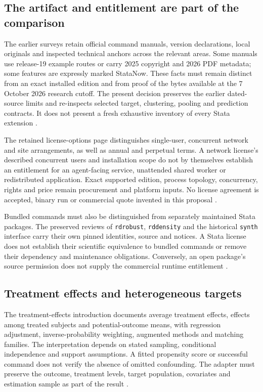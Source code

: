 \subsection{The artifact and entitlement are part of the comparison}
The earlier surveys retain official command manuals, version declarations,
local originals and inspected technical anchors across the relevant areas.
Some manuals use release-19 example routes or carry 2025 copyright and
2026 PDF metadata; some features are expressly marked StataNow. These
facts must remain distinct from an exact installed edition and from proof
of the bytes available at the 7 October 2026 research cutoff. The present
decision preserves the earlier dated-source limits and re-inspects selected
target, clustering, pooling and prediction contracts. It does not present
a fresh exhaustive inventory of every Stata extension
\citep{exec20_med_stata_multiple,exec18_gp_stata_post,exec24_stata_choice}.

The retained license-options page distinguishes single-user, concurrent
network and site arrangements, as well as annual and perpetual terms.
A network license's described concurrent users and installation scope do
not by themselves establish an entitlement for an agent-facing service,
unattended shared worker or redistributed application. Exact supported
edition, process topology, concurrency, rights and price remain procurement
and platform inputs. No license agreement is accepted, binary run or
commercial quote invented in this proposal \citep{exec13_ivrd_license,
exec24_stata_choice}.

Bundled commands must also be distinguished from separately maintained
Stata packages. The preserved reviews of \texttt{rdrobust},
\texttt{rddensity} and the historical \texttt{synth} interface carry their
own pinned identities, source and notices. A Stata license does not
establish their scientific equivalence to bundled commands or remove their
dependency and maintenance obligations. Conversely, an open package's
source permission does not supply the commercial runtime entitlement
\citep{exec13_ivrd_rdrobust,exec13_ivrd_rddensity,exec19_synth_stata_source,
exec24_stata_choice}.

\subsection{Treatment effects and heterogeneous targets}
The treatment-effects introduction documents average treatment effects,
effects among treated subjects and potential-outcome means, with regression
adjustment, inverse-probability weighting, augmented methods and matching
families. The interpretation depends on stated sampling, conditional
independence and support assumptions. A fitted propensity score or
successful command does not verify the absence of omitted confounding.
The adapter must preserve the outcome, treatment levels, target population,
covariates and estimation sample as part of the result
\citep{exec13_ci_stata_causal_intro}.

